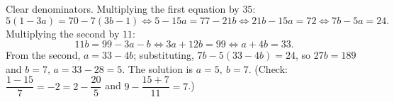 Clear denominators. Multiplying the first equation by $35$:
\[
5(1-3a)=70-7(3b-1)\iff5-15a=77-21b\iff21b-15a=72\iff7b-5a=24 .
\]
Multiplying the second by $11$:
\[
11b=99-3a-b\iff3a+12b=99\iff a+4b=33 .
\]
From the second, $a=33-4b$; substituting, $7b-5(33-4b)=24$, so $27b=189$ and $b=7$, $a=33-28=5$. The solution is $\boxed{a=5,\ b=7}$. (Check: $\dfrac{1-15}{7}=-2=2-\dfrac{20}{5}$ and $9-\dfrac{15+7}{11}=7$.)
